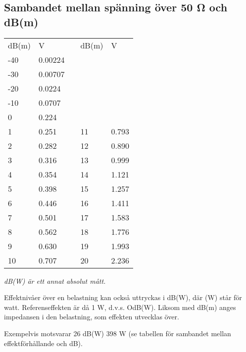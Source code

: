 \subsection{Sambandet mellan spänning över 50 Ω och dB(m)}
\begin{tabular}{l|lp{1cm}l|l}
  dB(m) & V & & dB(m) & V \\
  \cline{1-2} \cline{4-5}
  -40 & 0.00224 & & & \\
  -30 & 0.00707 & & & \\
  -20 & 0.0224  & & & \\
  -10 & 0.0707  & & & \\
  0   & 0.224   & & & \\
  1   & 0.251   & & 11 & 0.793 \\
  2   & 0.282   & & 12 & 0.890 \\
  3   & 0.316   & & 13 & 0.999 \\
  4   & 0.354   & & 14 & 1.121 \\
  5   & 0.398   & & 15 & 1.257 \\
  6   & 0.446   & & 16 & 1.411 \\
  7   & 0.501   & & 17 & 1.583 \\
  8   & 0.562   & & 18 & 1.776 \\
  9   & 0.630   & & 19 & 1.993 \\
  10  & 0.707   & & 20 & 2.236 \\
\end{tabular}

\emph{dB(W) är ett annat absolut mått.}

Effektnivåer över en belastning kan också uttryckas i dB(W), där (W)
står för watt.  Referenseffekten är då 1 W, d.v.s. OdB(W).  Liksom med
dB(m) anges impedansen i den belastning, som effekten utvecklas över.

Exempelvis motsvarar 26 dB(W) 398 W (se tabellen för sambandet mellan
effektförhållande och dB).
